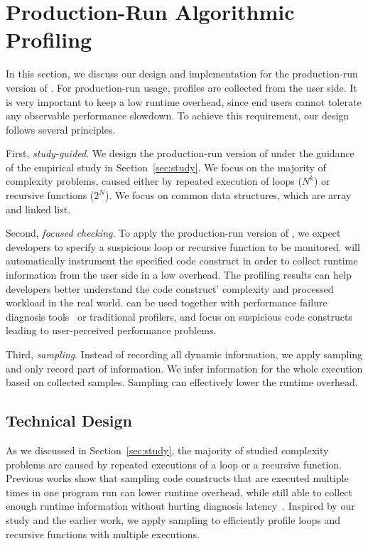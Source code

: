 \newpage
\section{Production-Run Algorithmic Profiling}
\label{sec:online}

In this section, we discuss our design and 
implementation for the production-run version of \Tool. 
For production-run usage, profiles are collected from the user side.
It is very important to keep a low runtime overhead, since
end users cannot tolerate any observable performance slowdown.
To achieve this requirement,
our design follows several principles. 

First, \textit{study-guided}. 
We design the production-run version of \Tool
under the guidance of the empirical study in Section~\ref{sec:study}.
We focus on the majority of complexity problems, 
caused either by repeated execution of loops ($N^k$)
or recursive functions ($2^N$).
We focus on common data structures, which are array and linked list.

Second, \textit{focused checking}.
To apply the production-run version of \Tool, 
we expect developers to specify a suspicious loop or recursive function
to be monitored. 
\Tool will automatically instrument the specified code construct 
in order to collect runtime information from the user side in a low overhead. 
The profiling results can help developers better understand the code construct' 
complexity and processed workload in the real world.
\Tool can be used together with performance failure 
diagnosis tools~\cite{SongOOPSLA2014} 
or traditional profilers,
and focus on suspicious code constructs leading 
to user-perceived performance problems.

Third, \textit{sampling}.
Instead of recording all dynamic information, 
we apply sampling and only record part of information. 
We infer information for the whole execution based on collected samples. 
Sampling can effectively lower the runtime overhead. 


\subsection{Technical Design}
As we discussed in Section~\ref{sec:study}, 
the majority of studied complexity problems are caused 
by repeated executions of a loop or a recursive function. 
Previous works show that sampling code constructs that are executed 
multiple times in one program run can lower runtime overhead, 
while still able to collect enough runtime information 
without hurting diagnosis latency~\cite{SongOOPSLA2014,ldoctor}. 
Inspired by our study and the earlier work, 
we apply sampling to efficiently profile loops 
and recursive functions with multiple executions. 

